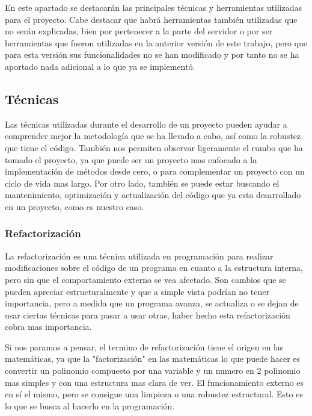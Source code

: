 

En este apartado se destacarán las principales técnicas y herramientas utilizadas para el proyecto. Cabe destacar que habrá herramientas también utilizadas que no serán explicadas, bien por pertenecer a la parte del servidor o por ser herramientas que fueron utilizadas en la anterior versión de este trabajo, pero que para esta versión sus funcionalidades no se han modificado y por tanto no se ha aportado nada adicional a lo que ya se implementó.

\subsection{Técnicas}

Las técnicas utilizadas durante el desarrollo de un proyecto pueden ayudar a comprender mejor la metodología que se ha llevado a cabo, así como la robustez que tiene el código. También nos permiten observar ligeramente el rumbo que ha tomado el proyecto, ya que puede ser un proyecto mas enfocado a la implementación de métodos desde cero, o para complementar un proyecto con un ciclo de vida mas largo. Por otro lado, también se puede estar buscando el mantenimiento, optimización y actualización del código que ya esta desarrollado en un proyecto, como es nuestro caso.

\subsubsection{Refactorización}

La refactorización \cite{refac1} \cite{refac2} es una técnica utilizada en programación para realizar modificaciones sobre el código de un programa en cuanto a la estructura interna, pero sin que el comportamiento externo se vea afectado. Son cambios que se pueden apreciar estructuralmente y que a simple vista podrían no tener importancia, pero a medida que un programa avanza, se actualiza o se dejan de usar ciertas técnicas para pasar a usar otras, haber hecho esta refactorización cobra mas importancia. 

Si nos paramos a pensar, el termino de refactorización tiene el origen en las matemáticas, ya que la "factorización" en las matemáticas lo que puede hacer es convertir un polinomio compuesto por una variable y un numero en 2 polinomio mas simples y con una estructura mas clara de ver. El funcionamiento externo es en sí el mismo, pero se consigue una limpieza o una robustez estructural. Esto es lo que se busca al hacerlo en la programación.

